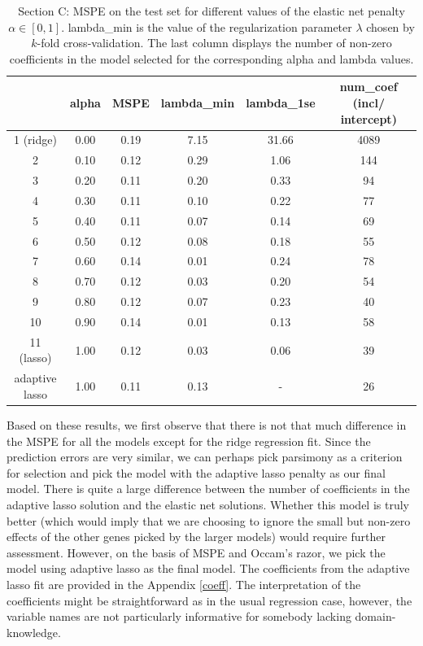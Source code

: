 \documentclass[paper=a4, fontsize=11pt]{scrartcl} %
\numberwithin{equation}{section} %
\begin{document}
\begin{table}[ht]
\centering
\begin{tabular}{c|ccccc}
  \hline
 & alpha & MSPE & lambda\_min & lambda\_1se & \thead{num\_coef \\ (incl/ intercept)} \\ 
  \hline
  1 (ridge) & 0.00 & 0.19 & 7.15 & 31.66 & 4089 \\
  \hline 
  2 & 0.10 & 0.12 & 0.29 & 1.06 & 144 \\ 
  3 & 0.20 & 0.11 & 0.20 & 0.33 &  94 \\ 
  4 & 0.30 & 0.11 & 0.10 & 0.22 &  77 \\ 
  5 & 0.40 & 0.11 & 0.07 & 0.14 &  69 \\ 
  6 & 0.50 & 0.12 & 0.08 & 0.18 &  55 \\ 
  7 & 0.60 & 0.14 & 0.01 & 0.24 &  78 \\ 
  8 & 0.70 & 0.12 & 0.03 & 0.20 &  54 \\ 
  9 & 0.80 & 0.12 & 0.07 & 0.23 &  40 \\ 
  10 & 0.90 & 0.14 & 0.01 & 0.13 &  58 \\
  \hline 
  11 (lasso) & 1.00 & 0.12 & 0.03 & 0.06 &  39 \\ 
  \hline
  \thead{adaptive \\ lasso} & 1.00 & 0.11 & 0.13 & - & 26 \\
   \hline
\end{tabular}
\caption{Section C: MSPE on the test set for different values of the elastic net penalty $\alpha \in [0,1]$. lambda\_min is the value of the regularization parameter $\lambda$ chosen by $k$-fold cross-validation. The last column displays the number of non-zero coefficients in the model selected for the corresponding alpha and lambda values.}
\label{highdim}
\end{table}

Based on these results, we first observe that there is not that much difference in the MSPE for all the models except for the ridge regression fit. Since the prediction errors are very similar, we can perhaps pick parsimony as a criterion for selection and pick the model with the adaptive lasso penalty as our final model. There is quite a large difference between the number of coefficients in the adaptive lasso solution and the elastic net solutions. Whether this model is truly better (which would imply that we are choosing to ignore the small but non-zero effects of the other genes picked by the larger models) would require further assessment. However, on the basis of MSPE and Occam's razor, we pick the model using adaptive lasso as the final model. The coefficients from the adaptive lasso fit are provided in the Appendix \ref{coeff}. The interpretation of the coefficients might be straightforward as in the usual regression case, however, the variable names are not particularly informative for somebody lacking domain-knowledge.
\end{document}
